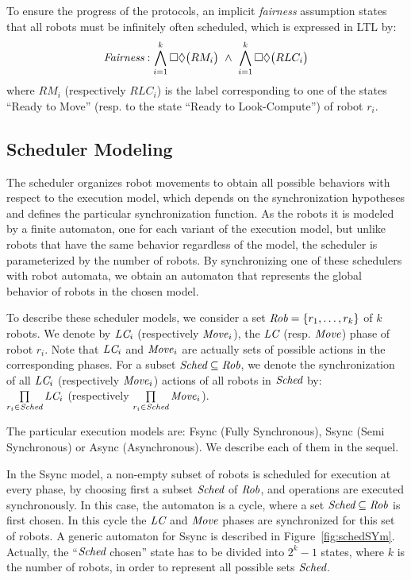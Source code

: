 To ensure the progress of the protocols, an implicit \emph{fairness}
assumption states that all robots must be infinitely often scheduled,
which is expressed in \textsf{LTL} by: \[\emph{Fairness}:\index{Fairness}
\bigwedge\limits_{i=1}^k \G\F\big(RM_i\big)~\wedge~
\bigwedge\limits_{i=1}^k \G\F\big(RLC_i\big)\] where $RM_i$
(respectively $RLC_i$) is the label corresponding to one of the states
``Ready to Move'' (resp. to the state ``Ready to Look-Compute'') of
robot $r_i$.



\subsection{Scheduler Modeling} 
\label{sec:mod:schedulers} The scheduler organizes robot movements to
obtain all possible behaviors with respect to the execution model,
which depends on the synchronization hypotheses and defines 
the particular synchronization function.
As the robots it is modeled by a finite automaton, one
for each variant of the execution model, but unlike robots that 
have the same behavior regardless of the model, the scheduler 
is parameterized by the number of robots. By synchronizing one of these
schedulers with robot automata, we obtain an automaton that represents
the global behavior of robots in the chosen model.  

To describe these scheduler models, we consider a set
$\textit{Rob}=\{r_1, \ldots, r_k\}$ of $k$ robots. We denote by
$\textit{LC}_i$ (respectively $\mathit{Move}_i$), the $\textit{LC}$
(resp. $\mathit{Move}$) phase of robot $r_i$. Note that
$\textit{LC}_i$ and $\mathit{Move}_i$ are actually sets of possible
actions in the corresponding phases. For a subset
$\textit{Sched}\subseteq\textit{Rob}$, we denote the synchronization
of all $\textit{LC}_i$ (respectively $\mathit{Move}_i$) actions of all
robots in $\textit{Sched}$ by:\\ $\prod\limits_{r_i \in
  \textit{Sched}}\textit{LC}_i$ (respectively $\prod\limits_{r_i \in
  \textit{Sched}}\mathit{Move}_i$).
  
  
  The particular execution models are: Fsync (Fully Synchronous), Ssync (Semi Synchronous)
  or Async (Asynchronous). We describe each of them in the sequel.

In the Ssync model, a non-empty subset of robots is scheduled for
execution at every phase, by choosing first a subset $\textit{Sched}$ of $\textit{Rob}$, and operations are executed
synchronously. In this case, the automaton is a cycle, where a set
$\textit{Sched} \subseteq \textit{Rob}$ is first chosen. In this cycle
the $\textit{LC}$ and $\mathit{Move}$ phases are synchronized for this set
of robots. A generic automaton for Ssync is described in
Figure~\ref{fig:schedSYm}.  Actually, the ``$\textit{Sched}$ chosen''
state has to be divided into $2^k-1$ states, where $k$ is the number of
robots, in order to represent all possible sets $\textit{Sched}$.

